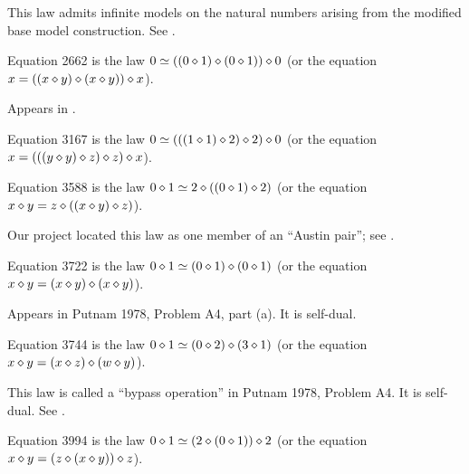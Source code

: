 This law admits infinite models on the natural numbers arising from the modified base model construction. See .

\begin{definition}[Equation 2662]\label{eq2662}\leanok{}  Equation 2662 is the law $0 \simeq  ((0 \diamond 1) \diamond (0 \diamond 1)) \diamond 0$ (or the equation $x = ((x \diamond y) \diamond (x \diamond y)) \diamond x$).
\end{definition}

Appears in \cite{mendelsohn-padmanabhan}.

\begin{definition}[Equation 3167]\label{eq3167}\leanok{}  Equation 3167 is the law $0 \simeq  (((1 \diamond 1) \diamond 2) \diamond 2) \diamond 0$ (or the equation $x = (((y \diamond y) \diamond z) \diamond z) \diamond x$).
\end{definition}


\begin{definition}[Equation 3588]
  \label{eq3588}\leanok{}
  Equation 3588 is the law $0 \diamond 1 \simeq 2 \diamond ((0 \diamond 1) \diamond 2)$ (or the equation $x \diamond y = z \diamond ((x \diamond y) \diamond z)$).
\end{definition}

Our project located this law as one member of an ``Austin pair''; see .

\begin{definition}[Equation 3722]\label{eq3722}\leanok{}  Equation 3722 is the law $0 \diamond 1  \simeq  (0 \diamond 1) \diamond (0 \diamond 1)$ (or the equation $x \diamond y = (x \diamond y) \diamond (x \diamond y)$).
\end{definition}

Appears in Putnam 1978, Problem A4, part (a).  It is self-dual.

\begin{definition}[Equation 3744]\label{eq3744}\leanok{}  Equation 3744 is the law $0 \diamond 1  \simeq  (0 \diamond 2) \diamond (3 \diamond 1)$ (or the equation $x \diamond y = (x \diamond z) \diamond (w \diamond y)$).
\end{definition}

This law is called a ``bypass operation'' in Putnam 1978, Problem A4. It is self-dual.  See .

\begin{definition}[Equation 3994]
  \label{eq3994}
  Equation 3994 is the law $0 \diamond 1 \simeq (2 \diamond (0 \diamond 1)) \diamond 2$ (or the equation $x \diamond y = (z \diamond (x \diamond y)) \diamond z$).
\end{definition}

